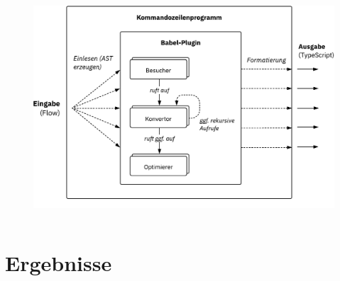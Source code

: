     \begin{frame}
      \vspace{1mm}
      \begin{columns}
        \column{\dimexpr\paperwidth-8mm}
        \begin{figure}
          \includegraphics[width=\textwidth]{src/figures/architecture-overview.pdf}
        \end{figure}
      \end{columns}
    \end{frame}


  \section{Ergebnisse}


